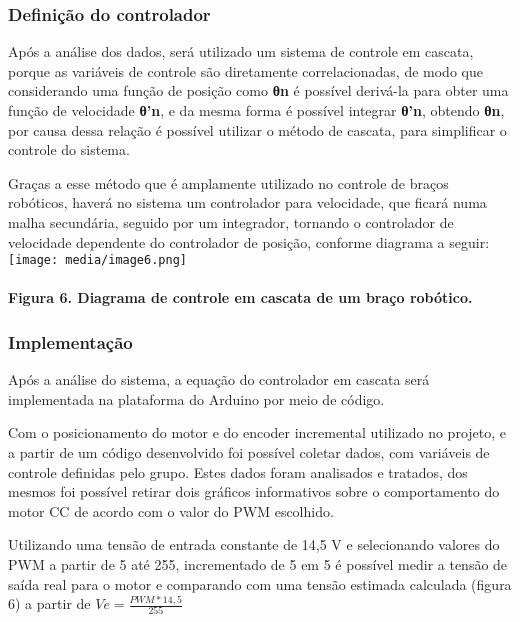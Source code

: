 \documentclass[]{article}
\let\oldparagraph\paragraph
\renewcommand{\paragraph}[1]{\oldparagraph{#1}\mbox{}}
\begin{document}
\subsubsection{Definição do
controlador}\label{definiuxe7uxe3o-do-controlador-1}

Após a análise dos dados, será utilizado um sistema de controle em
cascata, porque as variáveis de controle são diretamente
correlacionadas, de modo que considerando uma função de posição como
\textbf{θn} é possível derivá-la para obter uma função de velocidade
\textbf{θ'n}, e da mesma forma é possível integrar \textbf{θ'n}, obtendo
\textbf{θn}, por causa dessa relação é possível utilizar o método de
cascata, para simplificar o controle do sistema.

Graças a esse método que é amplamente utilizado no controle de braços
robóticos, haverá no sistema um controlador para velocidade, que ficará
numa malha secundária, seguido por um integrador, tornando o controlador
de velocidade dependente do controlador de posição, conforme diagrama a
seguir:\texttt{[image: media/image6.png]}

\paragraph{Figura 6. Diagrama de controle em cascata de um braço
robótico.}\label{figura-6.-diagrama-de-controle-em-cascata-de-um-brauxe7o-robuxf3tico.}

\subsubsection{Implementação}\label{implementauxe7uxe3o-1}

Após a análise do sistema, a equação do controlador em cascata será
implementada na plataforma do Arduino por meio de código.

Com o posicionamento do motor e do encoder incremental utilizado no
projeto, e a partir de um código desenvolvido foi possível coletar
dados, com variáveis de controle definidas pelo grupo. Estes dados foram
analisados e tratados, dos mesmos foi possível retirar dois gráficos
informativos sobre o comportamento do motor CC de acordo com o valor do
PWM escolhido.

Utilizando uma tensão de entrada constante de 14,5 V e selecionando
valores do PWM a partir de 5 até 255, incrementado de 5 em 5 é possível
medir a tensão de saída real para o motor e comparando com uma tensão
estimada calculada (figura 6) a partir de \(Ve = \frac{PWM*14,5}{255}\)
\end{document}
